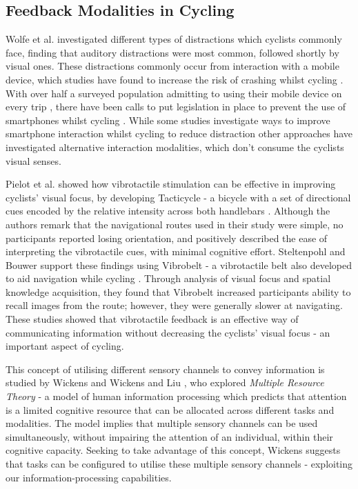 \documentclass{mpaper}
\begin{document}
\subsection{Feedback Modalities in Cycling}
Wolfe et al. \cite{wolfe2016distracted} investigated different types of distractions which cyclists commonly face, finding that auditory distractions were most common, followed shortly by visual ones. These distractions commonly occur from interaction with a mobile device, which studies have found to increase the risk of crashing whilst cycling \cite{mwakalonge2014distracted, doi:10.1080/19439962.2019.1591559}. With over half a surveyed population admitting to using their mobile device on every trip \cite{GOLDENBELD20121}, there have been calls to put legislation in place to prevent the use of smartphones whilst cycling \cite{banphoneuse}. While some studies investigate ways to improve smartphone interaction whilst cycling to reduce distraction \cite{10.1145/3544548.3580971, 10.1145/3152832.3152871} other approaches have investigated alternative interaction modalities, which don’t consume the cyclists visual senses.

Pielot et al. showed how vibrotactile stimulation can be effective in improving cyclists' visual focus, by developing Tacticycle - a bicycle with a set of directional cues encoded by the relative intensity across both handlebars \cite{10.1145/2371574.2371631}. Although the authors remark that the navigational routes used in their study were simple, no participants reported losing orientation, and positively described the ease of interpreting the vibrotactile cues, with minimal cognitive effort. Steltenpohl and Bouwer support these findings using Vibrobelt - a vibrotactile belt also developed to aid navigation while cycling \cite{10.1145/2449396.2449450}. Through analysis of visual focus and spatial knowledge acquisition, they found that Vibrobelt increased participants ability to recall images from the route; however, they were generally slower at navigating. These studies showed that vibrotactile feedback is an effective way of communicating information without decreasing the cyclists' visual focus - an important aspect of cycling.

This concept of utilising different sensory channels to convey information is studied by Wickens \cite{wickens1984processing} and Wickens and Liu \cite{doi:10.1177/001872088803000505}, who explored \textit{Multiple Resource Theory} - a model of human information processing which predicts that attention is a limited cognitive resource that can be allocated across different tasks and modalities. The model implies that multiple sensory channels can be used simultaneously, without impairing the attention of an individual, within their cognitive capacity. Seeking to take advantage of this concept, Wickens suggests that tasks can be configured to utilise these multiple sensory channels - exploiting our information-processing capabilities.
\end{document}
